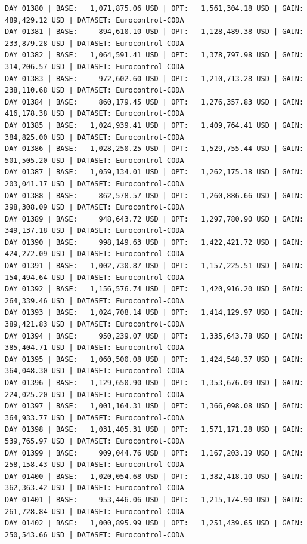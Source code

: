 \documentclass[11pt,a4paper]{article}
\begin{document}
\begin{verbatim}
DAY 01380 | BASE:   1,071,875.06 USD | OPT:   1,561,304.18 USD | GAIN: 489,429.12 USD | DATASET: Eurocontrol-CODA
DAY 01381 | BASE:     894,610.10 USD | OPT:   1,128,489.38 USD | GAIN: 233,879.28 USD | DATASET: Eurocontrol-CODA
DAY 01382 | BASE:   1,064,591.41 USD | OPT:   1,378,797.98 USD | GAIN: 314,206.57 USD | DATASET: Eurocontrol-CODA
DAY 01383 | BASE:     972,602.60 USD | OPT:   1,210,713.28 USD | GAIN: 238,110.68 USD | DATASET: Eurocontrol-CODA
DAY 01384 | BASE:     860,179.45 USD | OPT:   1,276,357.83 USD | GAIN: 416,178.38 USD | DATASET: Eurocontrol-CODA
DAY 01385 | BASE:   1,024,939.41 USD | OPT:   1,409,764.41 USD | GAIN: 384,825.00 USD | DATASET: Eurocontrol-CODA
DAY 01386 | BASE:   1,028,250.25 USD | OPT:   1,529,755.44 USD | GAIN: 501,505.20 USD | DATASET: Eurocontrol-CODA
DAY 01387 | BASE:   1,059,134.01 USD | OPT:   1,262,175.18 USD | GAIN: 203,041.17 USD | DATASET: Eurocontrol-CODA
DAY 01388 | BASE:     862,578.57 USD | OPT:   1,260,886.66 USD | GAIN: 398,308.09 USD | DATASET: Eurocontrol-CODA
DAY 01389 | BASE:     948,643.72 USD | OPT:   1,297,780.90 USD | GAIN: 349,137.18 USD | DATASET: Eurocontrol-CODA
DAY 01390 | BASE:     998,149.63 USD | OPT:   1,422,421.72 USD | GAIN: 424,272.09 USD | DATASET: Eurocontrol-CODA
DAY 01391 | BASE:   1,002,730.87 USD | OPT:   1,157,225.51 USD | GAIN: 154,494.64 USD | DATASET: Eurocontrol-CODA
DAY 01392 | BASE:   1,156,576.74 USD | OPT:   1,420,916.20 USD | GAIN: 264,339.46 USD | DATASET: Eurocontrol-CODA
DAY 01393 | BASE:   1,024,708.14 USD | OPT:   1,414,129.97 USD | GAIN: 389,421.83 USD | DATASET: Eurocontrol-CODA
DAY 01394 | BASE:     950,239.07 USD | OPT:   1,335,643.78 USD | GAIN: 385,404.71 USD | DATASET: Eurocontrol-CODA
DAY 01395 | BASE:   1,060,500.08 USD | OPT:   1,424,548.37 USD | GAIN: 364,048.30 USD | DATASET: Eurocontrol-CODA
DAY 01396 | BASE:   1,129,650.90 USD | OPT:   1,353,676.09 USD | GAIN: 224,025.20 USD | DATASET: Eurocontrol-CODA
DAY 01397 | BASE:   1,001,164.31 USD | OPT:   1,366,098.08 USD | GAIN: 364,933.77 USD | DATASET: Eurocontrol-CODA
DAY 01398 | BASE:   1,031,405.31 USD | OPT:   1,571,171.28 USD | GAIN: 539,765.97 USD | DATASET: Eurocontrol-CODA
DAY 01399 | BASE:     909,044.76 USD | OPT:   1,167,203.19 USD | GAIN: 258,158.43 USD | DATASET: Eurocontrol-CODA
DAY 01400 | BASE:   1,020,054.68 USD | OPT:   1,382,418.10 USD | GAIN: 362,363.42 USD | DATASET: Eurocontrol-CODA
DAY 01401 | BASE:     953,446.06 USD | OPT:   1,215,174.90 USD | GAIN: 261,728.84 USD | DATASET: Eurocontrol-CODA
DAY 01402 | BASE:   1,000,895.99 USD | OPT:   1,251,439.65 USD | GAIN: 250,543.66 USD | DATASET: Eurocontrol-CODA

\end{verbatim}
\end{document}
